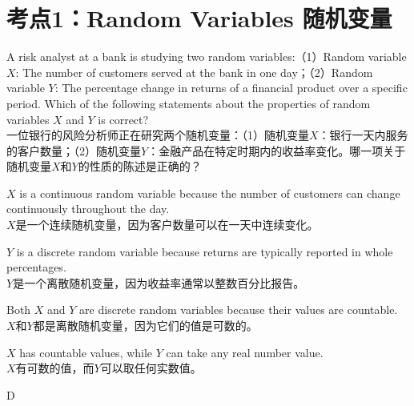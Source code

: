 \documentclass{article}
\newcounter{question} %
\begin{document}
 \tableofcontents %
\newpage






\section{考点1：Random Variables 随机变量}
\setcounter{question}{0}

\begin{question}
    A risk analyst at a bank is studying two random variables:（1）Random variable \(X\): The number of customers served at the bank in one day；（2）Random variable \(Y\): The percentage change in returns of a financial product over a specific period. Which of the following statements about the properties of random variables \(X\) and \(Y\) is correct? \\
    一位银行的风险分析师正在研究两个随机变量：（1）随机变量\(X\)：银行一天内服务的客户数量；（2）随机变量\(Y\)：金融产品在特定时期内的收益率变化。哪一项关于随机变量\(X\)和\(Y\)的性质的陈述是正确的？
\end{question}

\begin{choices}
    \item \(X\) is a continuous random variable because the number of customers can change continuously throughout the day.\\
    \(X\)是一个连续随机变量，因为客户数量可以在一天中连续变化。
    \item \(Y\) is a discrete random variable because returns are typically reported in whole percentages.\\
    \(Y\)是一个离散随机变量，因为收益率通常以整数百分比报告。
    \item Both \(X\) and \(Y\) are discrete random variables because their values are countable.\\
    \(X\)和\(Y\)都是离散随机变量，因为它们的值是可数的。
    \item \(X\) has countable values, while \(Y\) can take any real number value.\\
    \(X\)有可数的值，而\(Y\)可以取任何实数值。
\end{choices}

\begin{correctanswer}
    D
\end{correctanswer}
\end{document}
